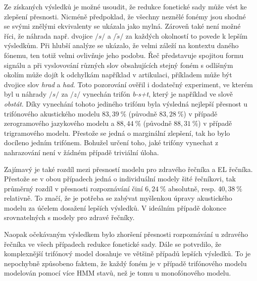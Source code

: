 Ze získaných výsledků je možné usoudit, že redukce fonetické sady může vést ke zlepšení přesnosti.
Nicméně předpoklad, že všechny neznělé fonémy jsou shodné se svými znělými ekvivalenty se ukázala jako mylná.
Zároveň také není možné říci, že náhrada např. dvojice $/s/$ a $/\check{s}/$  za každých okolností to povede k lepším výsledkům.
Při hlubší analýze se ukázalo, že velmi záleží na kontextu daného fónemu, ten totiž velmi ovlivňuje jeho podobu.
Řeč představuje spojitou formu signálu a při vyslovování různých slov obsahujících stejný foném s odlišným okolím  může dojít k odchylkám například v artikulaci, příkladem může být dvojice slov \textit{hrad} a \textit{had}.
Toto pozorování ověřil i dodatečný experiment, ve kterém byl u náhrady $/s/$ za $/z/$ vynechán trifón \textit{b-s+t}, který je například ve slově \textit{obstát}.
Díky vynechání tohoto jediného trifónu byla výsledná nejlepší přesnost u trifónového akustického modelu $83,39\ \%$ (původně $83,28\ \%$) v případě zerogramového jazykového modelu a $88,44\ \%$ (původně $88,31\ \%$) v případě trigramového modelu.
Přestože se jedná o marginální zlepšení, tak ho bylo docíleno jedním trifónem.
Bohužel určení toho, jaké trifóny vynechat z nahrazování není v žádném případě triviální úloha.

Zajímavý je také rozdíl mezi přesností modelu pro zdravého řečníka a EL řečníka.
Přestože se v obou případech jedná o individuální modely šité  řečníkovi, tak průměrný rozdíl v přesnosti rozpoznávání činí $6,24\ \%$ absolutně, resp. $40,38\ \%$ relativně.
To značí, že je potřeba se zabývat myšlenkou úpravy akustického modelu za účelem dosažení lepších výsledků.
V ideálním případě dokonce srovnatelných s modely pro zdravé řečníky.

Naopak očekávaným výsledkem bylo zhoršení přesnosti rozpoznávání u zdravého řečníka ve všech případech redukce fonetické sady.
Dále se potvrdilo, že komplexnější trifónový model dosahuje ve většině případů lepších výsledků.
To je nepochybně způsobeno faktem, že každý foném je v případě trifónového modelu modelován pomocí více HMM stavů, než je tomu u monofónového modelu.
